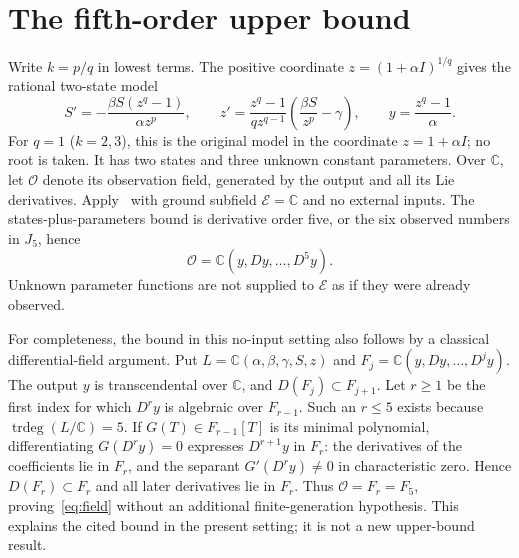 \documentclass[10pt,a4paper]{article}
\newcommand{\C}{\mathbb C}
\begin{document}
\section{The fifth-order upper bound}
\label{sec:upper}
Write $k=p/q$ in lowest terms. The positive coordinate
$z=(1+\alpha I)^{1/q}$ gives the rational two-state model
\begin{equation}
S'=-\frac{\beta S(z^q-1)}{\alpha z^p},\qquad
z'=\frac{z^q-1}{qz^{q-1}}
       \left(\frac{\beta S}{z^p}-\gamma\right),\qquad
y=\frac{z^q-1}{\alpha}.
\label{eq:cover}
\end{equation}
For $q=1$ ($k=2,3$), this is the original model in the coordinate
$z=1+\alpha I$; no root is taken.
It has two states and three unknown constant parameters. Over $\C$,
let $\mathcal O$ denote its observation field, generated by the output
and all its Lie derivatives. Apply~\cite[Theorem 4.12 and Remark 4.18]{DPR}
with ground subfield $\mathcal E=\C$ and no external inputs. The
states-plus-parameters bound is derivative order five, or the six
observed numbers in $J_5$, hence
\begin{equation}
\mathcal O=\C(y,Dy,\ldots,D^5y).
\label{eq:field}
\end{equation}
Unknown parameter functions are not supplied to $\mathcal E$ as if
they were already observed.

For completeness, the bound in this no-input setting also follows by
a classical differential-field argument. Put
$L=\C(\alpha,\beta,\gamma,S,z)$ and
$F_j=\C(y,Dy,\ldots,D^jy)$. The output $y$ is transcendental over
$\C$, and $D(F_j)\subset F_{j+1}$. Let $r\geq1$ be the first index
for which $D^ry$ is algebraic over $F_{r-1}$. Such an $r\leq5$
exists because $\operatorname{trdeg}(L/\C)=5$. If
$G(T)\in F_{r-1}[T]$ is its minimal polynomial, differentiating
$G(D^ry)=0$ expresses $D^{r+1}y$ in $F_r$: the derivatives of the
coefficients lie in $F_r$, and the separant
$G'(D^ry)\ne0$ in characteristic zero. Hence $D(F_r)\subset F_r$
and all later derivatives lie in $F_r$. Thus
$\mathcal O=F_r=F_5$, proving~\eqref{eq:field} without an additional
finite-generation hypothesis. This explains the cited bound in the
present setting; it is not a new upper-bound result.
\end{document}
